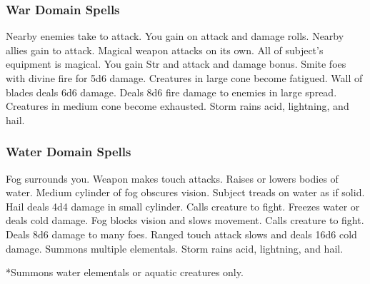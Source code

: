 \subsubsection{War Domain Spells}

\begin{spelllist}
   Nearby enemies take  to attack.
   You gain  on attack and damage rolls.
   Nearby allies gain  to attack.
   Magical weapon attacks on its own.
  \spellhead[3]{}
  \spellhead[3]{}
   All of subject's equipment is magical.
   You gain  Str and attack and damage bonus.
   Smite foes with divine fire for 5d6 damage.
   Creatures in large cone become fatigued.
   Wall of blades deals 6d6 damage.
  \spellhead[6]{}
  \spellhead[7]{}
  \spellhead[7]{}
   Deals 8d6 fire damage to enemies in large spread.
   Creatures in medium cone become exhausted.  
  \spellhead[9]{}
   Storm rains acid, lightning, and hail.
\end{spelllist}

\subsubsection{Water Domain Spells}

\begin{spelllist}
   Fog surrounds you.
  \spellhead[1]{}
   Weapon makes touch attacks. 
   Raises or lowers bodies of water.
   Medium cylinder of fog obscures vision.
  \spellhead[3]{}
   Subject treads on water as if solid.
   Hail deals 4d4 damage in small cylinder.
   Calls creature to fight.
  \spellhead[5]{}
  \spellhead[5]{}
   Freezes water or deals cold damage.
   Fog blocks vision and slows movement.
  \spellhead[7]{}
   Calls creature to fight.
   Deals 8d6 damage to many foes.
   Ranged touch attack slows and deals 16d6 cold damage.
   Summons multiple elementals.
   Storm rains acid, lightning, and hail.
\end{spelllist}
*Summons water elementals or aquatic creatures only.

